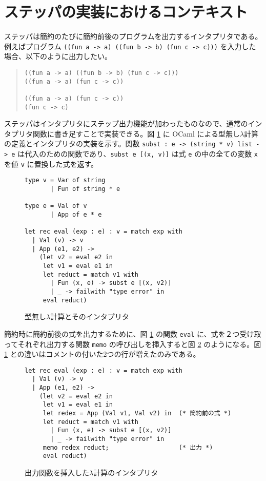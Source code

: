 \section{ステッパの実装におけるコンテキスト}
\label{section:context}

ステッパは簡約のたびに簡約前後のプログラムを出力するインタプリタである。例えばプログラム \texttt{((fun a -> a) ((fun b -> b) (fun c -> c)))} を入力した場合、以下のように出力したい。

\begin{quote}
\begin{verbatim}
((fun a -> a) ((fun b -> b) (fun c -> c)))
((fun a -> a) (fun c -> c))

((fun a -> a) (fun c -> c))
(fun c -> c)
\end{verbatim}
\end{quote}

ステッパはインタプリタにステップ出力機能が加わったものなので、通常のインタプリタ関数に書き足すことで実装できる。図 \ref{figure:lambda} に OCaml による型無し$\lambda$計算の定義とインタプリタの実装を示す。関数 \texttt{subst : e -> (string * v) list -> e} は代入のための関数であり、\texttt{subst e [(x, v)]} は式 \texttt{e} の中の全ての変数 \texttt{x} を値 \texttt{v} に置換した式を返す。

\begin{figure}
\begin{verbatim}
type v = Var of string
       | Fun of string * e

type e = Val of v
       | App of e * e

let rec eval (exp : e) : v = match exp with
  | Val (v) -> v
  | App (e1, e2) ->
    (let v2 = eval e2 in
     let v1 = eval e1 in
     let reduct = match v1 with
       | Fun (x, e) -> subst e [(x, v2)]
       | _ -> failwith "type error" in
     eval reduct)
\end{verbatim}
\caption{型無し$\lambda$計算とそのインタプリタ}
\label{figure:lambda}
\end{figure}

簡約時に簡約前後の式を出力するために、図 \ref{figure:lambda} の関数 \texttt{eval} に、式を２つ受け取ってそれぞれ出力する関数 \texttt{memo} の呼び出しを挿入すると図 \ref{figure:memo_label} のようになる。図 \ref{figure:lambda} との違いはコメントの付いた2つの行が増えたのみである。

\begin{figure}
\begin{verbatim}
let rec eval (exp : e) : v = match exp with
  | Val (v) -> v
  | App (e1, e2) ->
    (let v2 = eval e2 in
     let v1 = eval e1 in
     let redex = App (Val v1, Val v2) in  (* 簡約前の式 *)
     let reduct = match v1 with
       | Fun (x, e) -> subst e [(x, v2)]
       | _ -> failwith "type error" in
     memo redex reduct;                   (* 出力 *)
     eval reduct)
\end{verbatim}
\caption{出力関数を挿入した$\lambda$計算のインタプリタ}
\label{figure:memo_label}
\end{figure}

